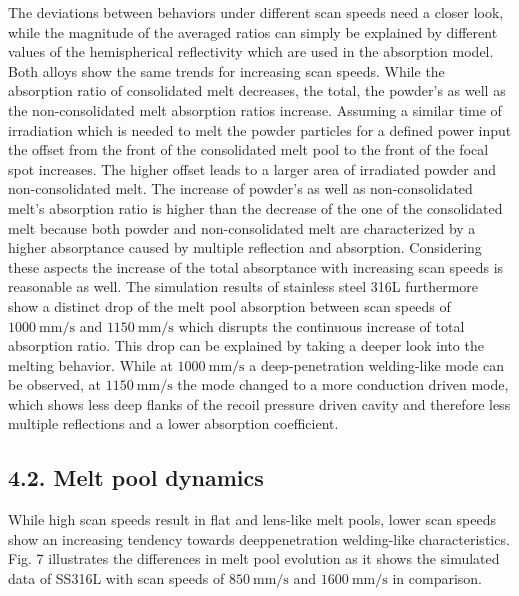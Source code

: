 \documentclass[10pt]{article}
\begin{document}
The deviations between behaviors under different scan speeds need a closer look, while the magnitude of the averaged ratios can simply be explained by different values of the hemispherical reflectivity which are used in the absorption model. Both alloys show the same trends for increasing scan speeds. While the absorption ratio of consolidated melt decreases, the total, the powder's as well as the non-consolidated melt absorption ratios increase. Assuming a similar time of irradiation which is needed to melt the powder particles for a defined power input the offset from the front of the consolidated melt pool to the front of the focal spot increases. The higher offset leads to a larger area of irradiated powder and non-consolidated melt. The increase of powder's as well as non-consolidated melt's absorption ratio is higher than the decrease of the one of the consolidated melt because both powder and non-consolidated melt are characterized by a higher absorptance caused by multiple reflection and absorption. Considering these aspects the increase of the total absorptance with increasing scan speeds is reasonable as well. The simulation results of stainless steel 316L furthermore show a distinct drop of the melt pool absorption between scan speeds of $1000 \mathrm{~mm} / \mathrm{s}$ and $1150 \mathrm{~mm} / \mathrm{s}$ which disrupts the continuous increase of total absorption ratio. This drop can be explained by taking a deeper look into the melting behavior. While at $1000 \mathrm{~mm} / \mathrm{s}$ a deep-penetration welding-like mode can be observed, at $1150 \mathrm{~mm} / \mathrm{s}$ the mode changed to a more conduction driven mode, which shows less deep flanks of the recoil pressure driven cavity and therefore less multiple reflections and a lower absorption coefficient.

\subsection*{4.2. Melt pool dynamics}
While high scan speeds result in flat and lens-like melt pools, lower scan speeds show an increasing tendency towards deeppenetration welding-like characteristics. Fig. 7 illustrates the differences in melt pool evolution as it shows the simulated data of SS316L with scan speeds of $850 \mathrm{~mm} / \mathrm{s}$ and $1600 \mathrm{~mm} / \mathrm{s}$ in comparison.
\end{document}
